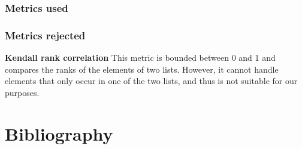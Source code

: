 \documentclass{article}
\begin{document}
\subsubsection{Metrics used}

\subsubsection{Metrics rejected}
\begin{description}
    \item \textbf{Kendall rank correlation} \cite{kendall_new_1938} This metric is bounded between 0 and 1 and compares the ranks of the elements of two lists. However, it cannot handle elements that only occur in one of the two lists, and thus is not suitable for our purposes.
    \item \textbf{}
\end{description}



\section{Bibliography}


\end{document}
